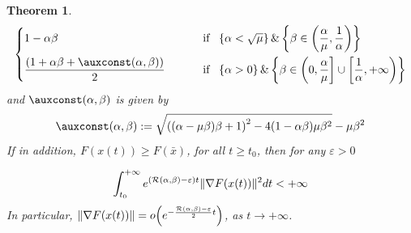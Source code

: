 \documentclass[reqno]{amsart}
\theoremstyle{plain}
\newtheorem{theorem}{Theorem}	%
\theoremstyle{definition}
\theoremstyle{remark}
\DeclarePairedDelimiter{\norm}{\lVert}{\rVert}	%
\newcommand{\petito}[1]{o\mathopen{}\left(#1\right)}
\newcommand{\Rb}{\mathcal{R}}
\newcommand{\PM}[1]{}
\begin{document}
\begin{theorem}
\begin{equation}
\begin{dcases}
			1-\alpha\beta   & \text{ if } ~   \left\{\alpha < \sqrt{\mu}\right\}\&  \left\{\beta\in\left(\frac{\alpha}{\mu},\frac{1}{\alpha}\right)\right\} 
            \\
			\frac{\left(1+\alpha\beta + \auxconst(\alpha,\beta)\right)}{2}   \qquad   & \text{ if } ~   \left\{  \alpha > 0\right\} \& \left\{\beta\in \left(0, \frac{\alpha}{\mu}\right]\cup \left[\frac{1}{\alpha},+\infty\right) \right\} 
		\end{dcases}
	\end{equation}
and $\auxconst(\alpha,\beta)$ is given by \begin{equation}\label{eq: q expression}
    \auxconst(\alpha,\beta):= \sqrt{\left((\alpha-\mu\beta)\beta+1\right)^{2}-4(1-\alpha\beta)\mu\beta^{2}} -\mu\beta^{2}
\end{equation}   
If in addition, $F(x(t)) \geq F(\bar{x})$, for all $t\geq t_{0}$, then for any $\varepsilon>0$
\PM{TODO: remove the integral, remove $\tilde\Rb$ and restate accordingly, being careful with open vs. closed intervals of validity.
Transfer stuff to remarks.}
	\begin{equation}\label{estimate grad basic teo}
		\int_{t_{0}}^{+\infty}e^{(\Rb(\alpha,\beta)-\varepsilon)t}\norm{\nabla F(x(t))}^2dt <+\infty
	\end{equation} 
	In particular, $\norm{\nabla F(x(t))}=\petito{e^{-\frac{\Rb(\alpha,\beta)-\varepsilon}{2}t}}$, as $t\to+\infty$. 
\end{theorem}

\end{document}
